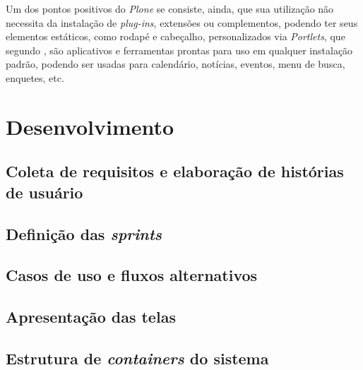 Um dos pontos positivos do \textit{Plone} se consiste, ainda, que sua utilização não necessita da instalação de \textit{plug-ins}, extensões ou complementos, podendo ter seus elementos estáticos, como rodapé e cabeçalho, personalizados via \textit{Portlets}, que segundo , são aplicativos e ferramentas prontas para uso em qualquer instalação padrão, podendo ser usadas para calendário, notícias, eventos, menu de busca, enquetes, etc. 

\hspace{2.5cm}

\section{Desenvolvimento}
\label{sec:desenvolvimento}

\hspace{2.5cm}


\subsection{Coleta de requisitos e elaboração de histórias de usuário}

\hspace{2.5cm}

\subsection{Definição das \textit{sprints}}

\hspace{2.5cm}

\subsection{Casos de uso e fluxos alternativos}

\hspace{2.5cm}

\subsection{Apresentação das telas}

\hspace{2.5cm}

\subsection{Estrutura de \textit{containers} do sistema}

